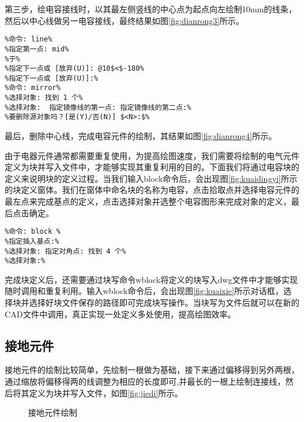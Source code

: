 第三步，绘电容接线时，以其最左侧竖线的中心点为起点向左绘制10mm的线条，然后以中心线做另一电容接线，最终结果如图\ref{fig:dianrong3}所示。

\begin{lstlisting}
%命令: line%
%指定第一点: mid%
%于%
%指定下一点或 [放弃(U)]: @10$<$-180%
%指定下一点或 [放弃(U)]:%
%命令: mirror%
%选择对象: 找到 1 个%
%选择对象:  指定镜像线的第一点: 指定镜像线的第二点:%
%要删除源对象吗？[是(Y)/否(N)] $<N>:$%
\end{lstlisting}
最后，删除中心线，完成电容元件的绘制，其结果如图\ref{fig:dianrong4}所示。

由于电器元件通常都需要重复使用，为提高绘图速度，我们需要将绘制的电气元件定义为块并写入文件中，才能够实现其重复利用的目的。下面我们将通过电容块的定义来说明块的定义过程。当我们输入block命令后，会出现图\ref{fig:kuaidingyi}所示的块定义窗体。我们在窗体中命名块的名称为电容，点击拾取点并选择电容元件的最左点来完成基点的定义，点击选择对象并选整个电容图形来完成对象的定义，最后点击确定。

\begin{lstlisting}
%命令: block %
%指定插入基点:%
%选择对象: 指定对角点: 找到 4 个%
%选择对象:%
\end{lstlisting}
完成块定义后，还需要通过块写命令wblock将定义的块写入dwg文件中才能够实现随时调用和重复利用。输入wblock命令后，会出现图\ref{fig:kuaixie}所示对话框，选择块并选择好块文件保存的路径即可完成块写操作。当块写为文件后就可以在新的CAD文件中调用，真正实现一处定义多处使用，提高绘图效率。

\noindent
\begin{figure}[htbp]
\centering
\begin{floatrow}
\end{floatrow}
\end{figure}
\indent

\subsection{接地元件}
接地元件的绘制比较简单，先绘制一根做为基础，接下来通过偏移得到另外两根，通过缩放将偏移得两的线调整为相应的长度即可,并最长的一根上绘制连接线，然后将其定义为块并写入文件，如图\ref{fig:jiedi}所示。

\noindent
\begin{figure}[htbp]
\centering
{}\hspace{30pt}
\hspace{30pt}
\caption{接地元件绘制}
\end{figure}

